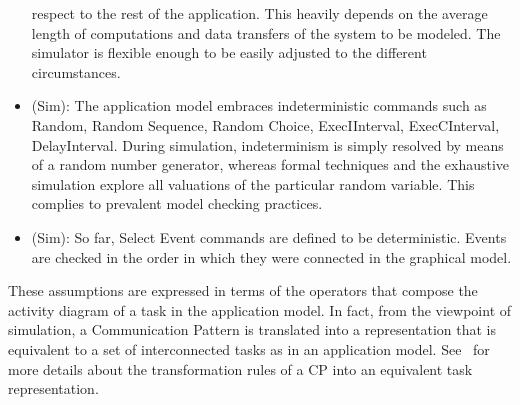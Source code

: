 \documentclass{llncs}
\begin{document}
\begin{subappendices}
\begin{itemize}
	respect to the rest of the application. This heavily depends on the average length of computations and data
	transfers of the system to be modeled. The simulator is flexible enough to be easily adjusted to the different
	circumstances.
	\item (Sim): The application model embraces indeterministic commands such as Random, Random Sequence, Random
	Choice, ExecIInterval, ExecCInterval, DelayInterval. During simulation, indeterminism is simply resolved by
	means of a random number generator, whereas formal techniques and the exhaustive simulation explore all
	valuations of the particular random variable. This complies to prevalent model checking practices.
	\item (Sim): So far, Select Event commands are defined to be deterministic. Events are checked in the order in
	which they were connected in the graphical model.
\end{itemize}
%
These assumptions are expressed in terms of the operators that compose the activity diagram of a task in the application
model. In fact, from the viewpoint of simulation, a Communication Pattern is translated into a representation that is
equivalent to a set of interconnected tasks as in an application model. See~\cite{EnriciThesis} for more
details about the transformation rules of a CP into an equivalent task representation.
%
%

\end{subappendices}
\end{document}
